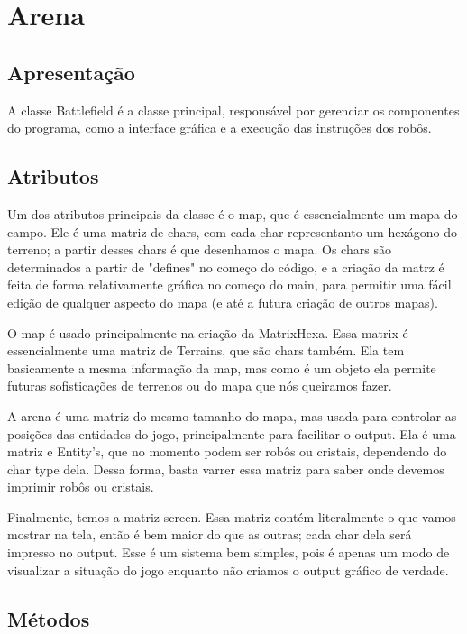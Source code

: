 \documentclass[a4paper]{article}
\begin{document}
\newpage
\section{Arena}
\subsection{Apresentação}
    A classe Battlefield é a classe principal, responsável por gerenciar os componentes do programa, como a interface gráfica e a execução das instruções dos robôs.
    
\subsection{Atributos}

    Um dos atributos principais da classe é o map, que é essencialmente um mapa do campo. Ele é uma matriz de chars, com cada char representanto um hexágono do terreno; a partir desses chars é que desenhamos o mapa. Os chars são determinados a partir de "defines" no começo do código, e a criação da matrz é feita de forma relativamente gráfica no começo do main, para permitir uma fácil edição de qualquer aspecto do mapa (e até a futura criação de outros mapas).
    
    O map é usado principalmente na criação da MatrixHexa. Essa matrix é essencialmente uma matriz de Terrains, que são chars também. Ela tem basicamente a mesma informação da map, mas como é um objeto ela permite futuras sofisticações de terrenos ou do mapa que nós queiramos fazer.
    
    A arena é uma matriz do mesmo tamanho do mapa, mas usada para controlar as posições das entidades do jogo, principalmente para facilitar o output. Ela é uma matriz e Entity's, que no momento podem ser robôs ou cristais, dependendo do char type dela. Dessa forma, basta varrer essa matriz para saber onde devemos imprimir robôs ou cristais.
    
    Finalmente, temos a matriz screen. Essa matriz contém literalmente o que vamos mostrar na tela, então é bem maior do que as outras; cada char dela será impresso no output. Esse é um sistema bem simples, pois é apenas um modo de visualizar a situação do jogo enquanto não criamos o output gráfico de verdade.

\subsection{Métodos}
\end{document}
